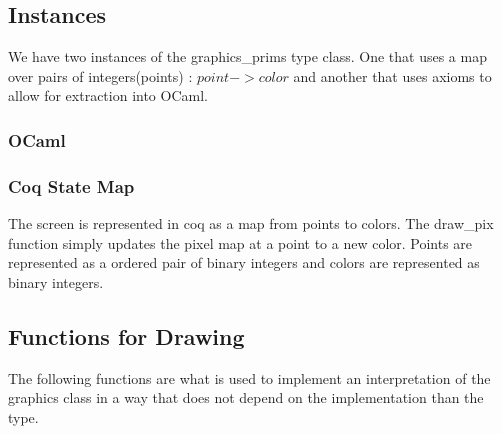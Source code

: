 \documentclass{llncs}
\begin{document}
\subsection{Instances}
We have two instances of the graphics\_prims type class.  One that uses a map over pairs of integers(points) : $point -> color$ and another that
uses axioms to allow for extraction into OCaml.

  \subsubsection{OCaml}
  \subsubsection{Coq State Map}
  The screen is represented in coq as a map from points to colors. The draw\_pix function simply updates the pixel map at a point to a new color. Points are represented as a ordered pair of binary integers and colors are represented as binary integers.



  



\subsection{Functions for Drawing}
The following functions are what is used to implement an interpretation of the graphics class in a way that does not depend on the implementation than the type.
\end{document}
